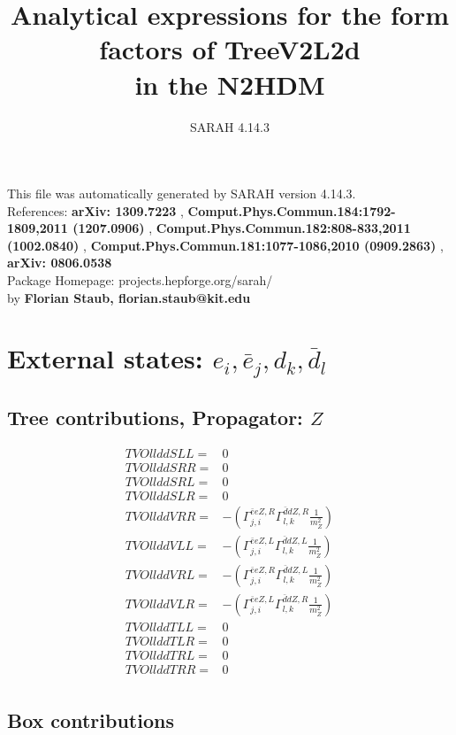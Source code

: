 \documentclass[A4,landscape]{article}
\begin{document}
\title{Analytical expressions for the form factors of TreeV2L2d\\ in the N2HDM } 
 \author{SARAH 4.14.3} 
 \maketitle 
 \vspace{10cm} 
This file was automatically generated by SARAH version 4.14.3.  \\ 
References: {\bf arXiv: 1309.7223 }, {\bf Comput.Phys.Commun.184:1792-1809,2011 (1207.0906) }, {\bf Comput.Phys.Commun.182:808-833,2011 (1002.0840) }, {\bf Comput.Phys.Commun.181:1077-1086,2010 (0909.2863) }, {\bf arXiv: 0806.0538 } \\ 
Package Homepage: projects.hepforge.org/sarah/ \\ 
by {\bf Florian Staub, florian.staub@kit.edu} 
 \pagebreak 
 \tableofcontents 
 \pagebreak 
\section{External states: ${e_{{i}}, \bar{e}_{{j}}, d_{{k}}, \bar{d}_{{l}}}$} 
\subsection{Tree contributions, Propagator: $Z$} 

\begin{align} 
  TVOllddSLL= & 0 \\ 
  TVOllddSRR= & 0 \\ 
  TVOllddSRL= & 0 \\ 
  TVOllddSLR= & 0 \\ 
  TVOllddVRR= & -(\Gamma^{\bar{e}e Z ,R}_{j, i} \Gamma^{\bar{d}d Z ,R}_{l, k} \frac{1}{m^2_{Z}}) \\ 
  TVOllddVLL= & -(\Gamma^{\bar{e}e Z ,L}_{j, i} \Gamma^{\bar{d}d Z ,L}_{l, k} \frac{1}{m^2_{Z}}) \\ 
  TVOllddVRL= & -(\Gamma^{\bar{e}e Z ,R}_{j, i} \Gamma^{\bar{d}d Z ,L}_{l, k} \frac{1}{m^2_{Z}}) \\ 
  TVOllddVLR= & -(\Gamma^{\bar{e}e Z ,L}_{j, i} \Gamma^{\bar{d}d Z ,R}_{l, k} \frac{1}{m^2_{Z}}) \\ 
  TVOllddTLL= & 0 \\ 
  TVOllddTLR= & 0 \\ 
  TVOllddTRL= & 0 \\ 
  TVOllddTRR= & 0 \\ 
\end{align} 
\subsection{Box contributions} 
\end{document}
